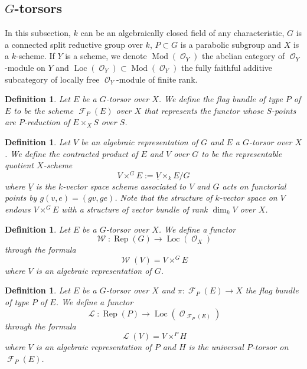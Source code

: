 \documentclass[11pt]{amsart}
\numberwithin{subsection}{section}
\numberwithin{figure}{section}
\numberwithin{table}{section}
\theoremstyle{1}
\newtheorem{definition}[theorem]{Definition}
\theoremstyle{2}
\DeclareMathOperator{\Rep}{Rep}
\DeclareMathOperator{\Lc}{\mathcal{L}}
\DeclareMathOperator{\Fc}{\mathcal{F}}
\DeclareMathOperator{\Oc}{\mathcal{O}}
\DeclareMathOperator{\W}{\mathcal{W}}
\DeclareMathOperator{\Mod}{Mod}
\DeclareMathOperator{\Loc}{Loc}
\begin{document}
\subsection{$G$-torsors}
In this subsection, $k$ can be an algebraically closed field of any characteristic, $G$ is a connected split reductive group over $k$, $P \subset G$ is a parabolic subgroup and $X$ is a $k$-scheme. If $Y$ is a scheme, we denote $\Mod(\Oc_Y)$ the abelian category of $\Oc_Y$-module on $Y$ and $\Loc(\Oc_Y) \subset \Mod(\Oc_Y)$ the fully faithful additive subcategory of locally free $\Oc_Y$-module of finite rank.
\begin{definition}\label{def1}
Let $E$ be a $G$-torsor over $X$. We define the flag bundle of type $P$ of $E$ to be the scheme $\Fc_P(E)$ over $X$ that represents the functor whose $S$-points are $P$-reduction of $E \times_X S$ over $S$.
\end{definition}
\begin{definition}
Let $V$ be an algebraic representation of $G$ and $E$ a $G$-torsor over $X$. We define the contracted product of $E$ and $V$ over $G$ to be the representable quotient $X$-scheme 
\begin{equation*}
V\times^G E := \underline{V} \times_k E / G
\end{equation*}
where $\underline{V}$ is the $k$-vector space scheme associated to $V$ and $G$ acts on functorial points by $g(v,e) = (gv,ge)$. Note that the structure of $k$-vector space on $V$ endows $V\times^G E$ with a structure of vector bundle of rank $\dim_k V$ over $X$.
\end{definition}
\begin{definition}\label{def_W}
Let $E$ be a $G$-torsor over $X$. We define a functor
\begin{equation*}
\W : \Rep(G) \rightarrow \Loc(\Oc_X)
\end{equation*}
through the formula 
\begin{equation*}
\W(V) = V \times^G E
\end{equation*}
where $V$ is an algebraic representation of $G$.
\end{definition}
\begin{definition}\label{def_L}
Let $E$ be a $G$-torsor over $X$ and $\pi : \Fc_P(E) \rightarrow X$ the flag bundle of type $P$ of $E$. We define a functor
\begin{equation*}
\Lc : \Rep(P) \rightarrow \Loc(\Oc_{\Fc_P(E)})
\end{equation*}
through the formula 
\begin{equation*}
\Lc(V) = V \times^P H
\end{equation*}
where $V$ is an algebraic representation of $P$ and $H$ is the universal $P$-torsor on $\Fc_P(E)$.
\end{definition}
\end{document}

